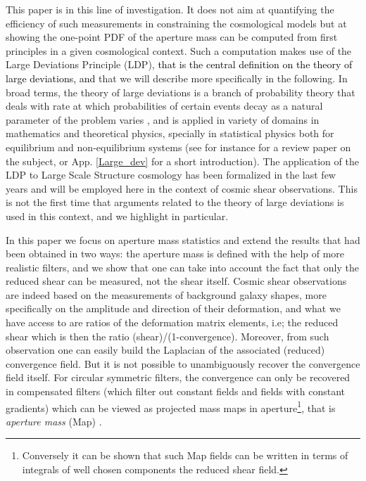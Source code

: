 \documentclass[twocolumn,aps,reprint, nofootinbib]{revtex4}
\newcommand{\pr}[1]{{\textcolor{black}{\textit{} #1}}}
\begin{document}
This paper is in this line of investigation. It does not aim at quantifying the efficiency of such measurements in constraining the cosmological models but at showing the one-point PDF of the aperture mass can be computed from first principles in a given cosmological context. Such a computation makes use of the Large Deviations Principle (LDP), \pr{that is the central definition on the theory of large deviations, and} that we will describe more specifically in the following. 
In broad terms, the theory of large deviations \cite{varadhan, der_hollander, ellis} is a branch of probability theory that  deals with rate at which probabilities of certain events decay as a natural parameter of the problem varies \cite{varadhan_lec_notes}, and is applied in variety of domains in mathematics and theoretical physics, specially in statistical physics both for equilibrium and non-equilibrium systems (see for instance \cite{2009PhR...478....1T} for a review paper on the subject, or App. \ref{Large_dev} for a short introduction). The application of the LDP to Large Scale Structure cosmology has been formalized in the last few years \cite{2002A&A...382..412V, bernardeau2014statistics, Bernardeau:2015khs, uhlemann2016back} and will be employed here in the context of cosmic shear observations.  This is not the first time that arguments related to the theory of large deviations is used in this context, and we highlight \cite{bernardeau2000construction, munshi2004weak, valageas2004analytical, barber2004linear} in particular.

In this paper we focus on aperture mass statistics and extend the results that had been obtained in two ways: the aperture mass is defined with the help of more realistic filters, and we show that one can take into account the fact that only the reduced shear can be measured, not the shear itself. Cosmic shear observations are indeed based on the measurements of background galaxy shapes, more specifically on the amplitude and direction of their deformation, and what we have access to are ratios of the deformation matrix elements, i.e; the reduced shear which is then the ratio (shear)/(1-convergence). Moreover, from such observation one can easily build the Laplacian of the associated (reduced) convergence field.  But it is not possible to unambiguously recover the convergence field itself. For circular symmetric filters, the convergence can only be recovered in compensated filters (which filter out constant fields and fields with constant gradients) which can be viewed as projected mass maps in aperture\footnote{Conversely it can be shown that such Map fields can be written in terms of integrals of well chosen components the reduced shear field.}, that is \emph{aperture mass} (Map) \cite{kaiser1995nonlinear, schneider1996detection}. 
\end{document}
